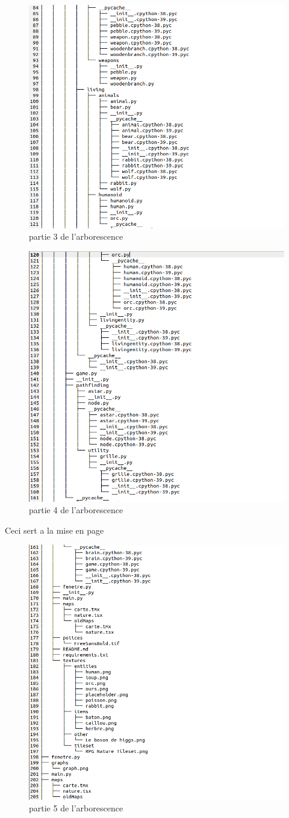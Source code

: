 \documentclass[a4paper, 11pt]{article}
\begin{document}
\begin{figure}[ht!]
 \centering
 \includegraphics[width=0.5\linewidth]{images/arborecsens/arbrepart3.png}
 \caption{partie 3 de l'arborescence}
 \label{fig::example::one}
\end{figure}
\begin{figure}[ht!]
 \centering
 \includegraphics[width=0.5\linewidth]{images/arborecsens/arbrepart4.png}
 \caption{partie 4 de l'arborescence}
 \label{fig::example::one}
\end{figure}
\newpage
{\color{white}Ceci sert a la mise en page}
\newpage
\begin{figure}[ht!]
 \centering
 \includegraphics[width=0.5\linewidth]{images/arborecsens/arbrepart5.png}
 \caption{partie 5 de l'arborescence}
 \label{fig::example::one}
\end{figure}
\end{document}
